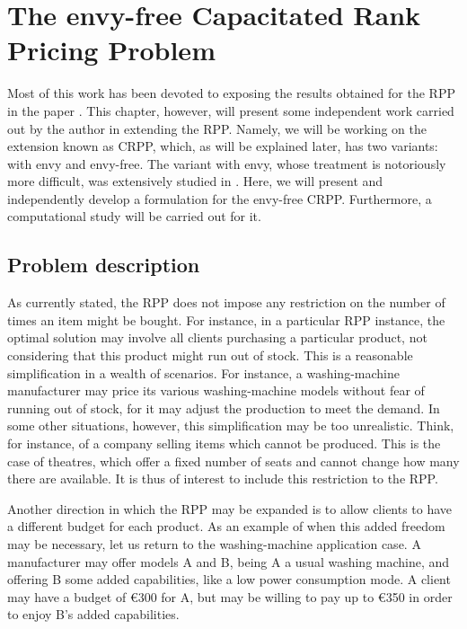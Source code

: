 \chapter{The envy-free Capacitated Rank Pricing Problem}
\label{chp:crpp-without-envy}

Most of this work has been devoted to exposing the results obtained for the RPP
in the paper \cite{ca:rpp}. This chapter, however, will present some independent
work carried out by the author in extending the RPP. Namely, we will be working
on the extension known as CRPP, which, as will be explained later, has two
variants: with envy and envy-free. The variant with envy, whose treatment is
notoriously more difficult, was extensively studied in \cite{do:envy}. Here, we
will present and independently develop a formulation for the envy-free CRPP.
Furthermore, a computational study will be carried out for it.

\section{Problem description} %
\label{sec:cwe:problem-description}

As currently stated, the RPP does not impose any restriction on the number of
times an item might be bought. For instance, in a particular RPP instance, the
optimal solution may involve all clients purchasing a particular product, not
considering that this product might run out of stock. This is a reasonable
simplification in a wealth of scenarios. For instance, a washing-machine
manufacturer may price its various washing-machine models without fear of
running out of stock, for it may adjust the production to meet the demand. In
some other situations, however, this simplification may be too unrealistic.
Think, for instance, of a company selling items which cannot be produced. This
is the case of theatres, which offer a fixed number of seats and cannot change
how many there are available. It is thus of interest to include this restriction
to the RPP.

Another direction in which the RPP may be expanded is to allow clients to have a
different budget for each product. As an example of when this added freedom may
be necessary, let us return to the washing-machine application case. A
manufacturer may offer models A and B, being A a usual washing machine, and
offering B some added capabilities, like a low power consumption mode. A client
may have a budget of \euro{300} for A, but may be willing to pay up to
\euro{350} in order to enjoy B's added capabilities.

